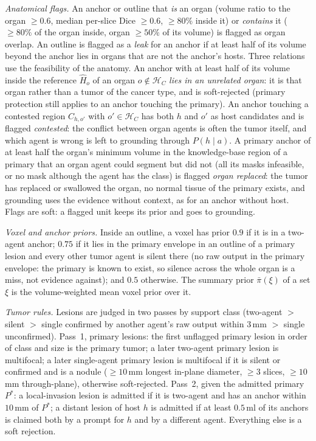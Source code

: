 \documentclass[fleqn,10pt]{olplainarticle}
\begin{document}
\emph{Anatomical flags.} An anchor or outline that \emph{is} an organ (volume ratio to the organ $\ge0.6$, median per-slice
Dice $\ge0.6$, $\ge80\%$ inside it) or \emph{contains} it ($\ge80\%$ of the organ inside, organ $\ge50\%$ of its volume) is
flagged as organ overlap. An outline is flagged as a \emph{leak} for an anchor if at least half of its volume beyond the
anchor lies in organs that are not the anchor's hosts. Three relations use the feasibility of the anatomy. An anchor with at
least half of its volume inside the reference $\hat H_o$ of an organ $o\notin\mathcal{H}_C$ \emph{lies in an unrelated
organ}: it is that organ rather than a tumor of the cancer type, and is soft-rejected (primary protection still applies to an
anchor touching the primary). An anchor touching a contested region $C_{h,o'}$ with $o'\in\mathcal{H}_C$ has both $h$ and $o'$
as host candidates and is flagged \emph{contested}: the conflict between organ agents is often the tumor itself, and which
agent is wrong is left to grounding through $P(h\mid a)$. A primary anchor of at least half the organ's minimum volume in the knowledge-base region of a primary that an organ agent
could segment but did not (all its masks infeasible, or no mask although the agent has the class) is flagged
\emph{organ replaced}: the tumor has replaced or swallowed the organ, no normal tissue of the primary
exists, and grounding uses the evidence without context, as for an anchor without host. Flags are soft: a flagged unit
keeps its prior and goes to grounding.

\emph{Voxel and anchor priors.} Inside an outline, a voxel has prior $0.9$ if it is in a two-agent anchor; $0.75$ if it
lies in the primary envelope in an outline of a primary lesion and every other tumor agent is silent there (no raw output in
the primary envelope: the primary is known to exist, so silence across the whole organ is a miss, not evidence against);
and $0.5$ otherwise. The summary prior $\bar\pi(\xi)$ of a set $\xi$ is the volume-weighted mean voxel prior over it.

\emph{Tumor rules.} Lesions are judged in two passes by support class (two-agent $>$ silent $>$ single confirmed by another
agent's raw output within $3$\,mm $>$ single unconfirmed). Pass~1, primary lesions: the first unflagged primary lesion in
order of class and size is the primary tumor; a later two-agent primary lesion is multifocal; a later single-agent primary
lesion is multifocal if it is silent or confirmed and is a nodule ($\ge10$\,mm longest in-plane diameter, $\ge3$ slices,
$\ge10$\,mm through-plane), otherwise soft-rejected. Pass~2, given the admitted primary $P^{*}$: a local-invasion lesion is
admitted if it is two-agent and has an anchor within $10$\,mm of $P^{*}$; a distant lesion of host $h$ is admitted if at least
$0.5$\,ml of its anchors is claimed both by a prompt for $h$ and by a different agent. Everything else is a soft rejection.
\end{document}
